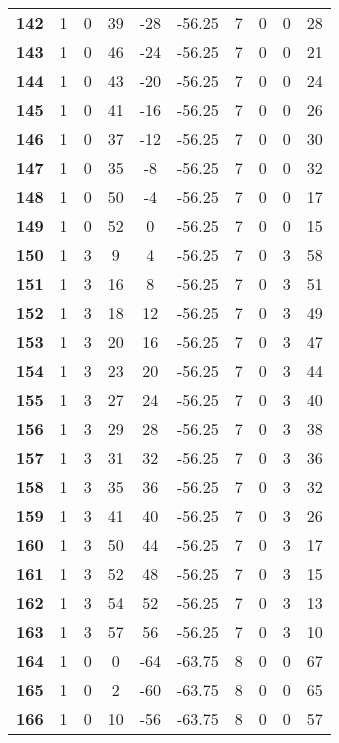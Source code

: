 \documentclass[12pt,letterpaper, onecolumn]{exam}
\begin{document}
\begin{longtable}{cccccccccc}
    \textbf{142} & 1 & 0 & 39 & -28 & -56.25 & 7 & 0 & 0 & 28 \\ 
    \textbf{143} & 1 & 0 & 46 & -24 & -56.25 & 7 & 0 & 0 & 21 \\ 
    \textbf{144} & 1 & 0 & 43 & -20 & -56.25 & 7 & 0 & 0 & 24 \\ 
    \textbf{145} & 1 & 0 & 41 & -16 & -56.25 & 7 & 0 & 0 & 26 \\ 
    \textbf{146} & 1 & 0 & 37 & -12 & -56.25 & 7 & 0 & 0 & 30 \\ 
    \textbf{147} & 1 & 0 & 35 & -8 & -56.25 & 7 & 0 & 0 & 32 \\ 
    \textbf{148} & 1 & 0 & 50 & -4 & -56.25 & 7 & 0 & 0 & 17 \\ 
    \textbf{149} & 1 & 0 & 52 & 0 & -56.25 & 7 & 0 & 0 & 15 \\ 
    \textbf{150} & 1 & 3 & 9 & 4 & -56.25 & 7 & 0 & 3 & 58 \\ 
    \textbf{151} & 1 & 3 & 16 & 8 & -56.25 & 7 & 0 & 3 & 51 \\ 
    \textbf{152} & 1 & 3 & 18 & 12 & -56.25 & 7 & 0 & 3 & 49 \\ 
    \textbf{153} & 1 & 3 & 20 & 16 & -56.25 & 7 & 0 & 3 & 47 \\ 
    \textbf{154} & 1 & 3 & 23 & 20 & -56.25 & 7 & 0 & 3 & 44 \\ 
    \textbf{155} & 1 & 3 & 27 & 24 & -56.25 & 7 & 0 & 3 & 40 \\     \hline
    \textbf{156} & 1 & 3 & 29 & 28 & -56.25 & 7 & 0 & 3 & 38 \\ 
    \textbf{157} & 1 & 3 & 31 & 32 & -56.25 & 7 & 0 & 3 & 36 \\ 
    \textbf{158} & 1 & 3 & 35 & 36 & -56.25 & 7 & 0 & 3 & 32 \\ 
    \textbf{159} & 1 & 3 & 41 & 40 & -56.25 & 7 & 0 & 3 & 26 \\ 
    \textbf{160} & 1 & 3 & 50 & 44 & -56.25 & 7 & 0 & 3 & 17 \\ 
    \textbf{161} & 1 & 3 & 52 & 48 & -56.25 & 7 & 0 & 3 & 15 \\ 
    \textbf{162} & 1 & 3 & 54 & 52 & -56.25 & 7 & 0 & 3 & 13 \\ 
    \textbf{163} & 1 & 3 & 57 & 56 & -56.25 & 7 & 0 & 3 & 10 \\ 
    \textbf{164} & 1 & 0 & 0 & -64 & -63.75 & 8 & 0 & 0 & 67 \\ 
    \textbf{165} & 1 & 0 & 2 & -60 & -63.75 & 8 & 0 & 0 & 65 \\ 
    \textbf{166} & 1 & 0 & 10 & -56 & -63.75 & 8 & 0 & 0 & 57 \\ 

\end{longtable}
\end{document}

